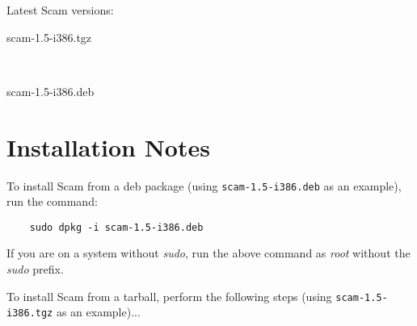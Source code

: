 \documentclass{article}
\begin{document}
Latest Scam versions:

\begin{description}
    \item
         {scam-1.5-i386.tgz}
    \item
    \item
    \item
        ~
    \item
         {scam-1.5-i386.deb}
    \item
\end{description}

%
%


\section*{Installation Notes}

To install Scam from a deb package
(using {\tt scam-1.5-i386.deb} as an example), run the command:

\begin{verbatim}
    sudo dpkg -i scam-1.5-i386.deb
\end{verbatim}

If you are on a system without {\it sudo}, run the above command
as {\it root} without the {\it sudo} prefix.

To install Scam from a tarball, perform the following steps
(using {\tt scam-1.5-i386.tgz} as an example)...
\end{document}
